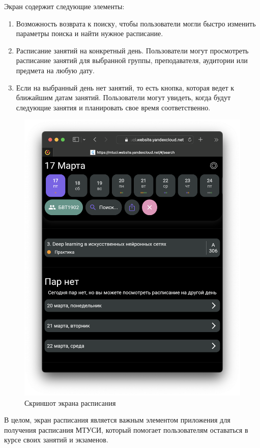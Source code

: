 Экран содержит следующие элементы:

\begin{enumerate}
    \item Возможность возврата к поиску, 
    чтобы пользователи могли быстро изменить параметры поиска и найти нужное расписание.
    \item Расписание занятий на конкретный день.
    Пользователи могут просмотреть расписание занятий для выбранной группы,
    преподавателя, аудитории или предмета на любую дату.
    \item Если на выбранный день нет занятий,
    то есть кнопка, которая ведет к ближайшим датам занятий.
    Пользователи могут увидеть, когда будут следующие занятия и планировать свое время соответственно.
\end{enumerate}


\begin{figure}
\centering
\includegraphics[width=0.8\linewidth]{images/app/rasp.png}
\caption{Скриншот экрана расписания}
\label{fig:app:rasp}
\end{figure}

В целом, экран расписания является важным элементом приложения
для получения расписания МТУСИ, который помогает пользователям оставаться
в курсе своих занятий и экзаменов.

